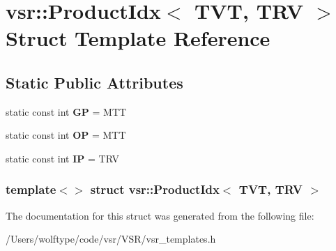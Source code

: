 \hypertarget{structvsr_1_1_product_idx_3_01_t_v_t_00_01_t_r_v_01_4}{\section{vsr\-:\-:Product\-Idx$<$ T\-V\-T, T\-R\-V $>$ Struct Template Reference}
\label{structvsr_1_1_product_idx_3_01_t_v_t_00_01_t_r_v_01_4}
}
\subsection*{Static Public Attributes}
\begin{DoxyCompactItemize}
\item 
\hypertarget{structvsr_1_1_product_idx_3_01_t_v_t_00_01_t_r_v_01_4_a828f12d7cfa2a603894dca8820d804c8}{static const int {\bfseries G\-P} = M\-T\-T}\label{structvsr_1_1_product_idx_3_01_t_v_t_00_01_t_r_v_01_4_a828f12d7cfa2a603894dca8820d804c8}

\item 
\hypertarget{structvsr_1_1_product_idx_3_01_t_v_t_00_01_t_r_v_01_4_ae8e260a0cc7a30100ac0fe132a823baa}{static const int {\bfseries O\-P} = M\-T\-T}\label{structvsr_1_1_product_idx_3_01_t_v_t_00_01_t_r_v_01_4_ae8e260a0cc7a30100ac0fe132a823baa}

\item 
\hypertarget{structvsr_1_1_product_idx_3_01_t_v_t_00_01_t_r_v_01_4_a2198e257dcaee978f438597cedb15071}{static const int {\bfseries I\-P} = T\-R\-V}\label{structvsr_1_1_product_idx_3_01_t_v_t_00_01_t_r_v_01_4_a2198e257dcaee978f438597cedb15071}

\end{DoxyCompactItemize}
\subsubsection*{template$<$$>$ struct vsr\-::\-Product\-Idx$<$ T\-V\-T, T\-R\-V $>$}



The documentation for this struct was generated from the following file\-:\begin{DoxyCompactItemize}
\item 
/\-Users/wolftype/code/vsr/\-V\-S\-R/vsr\-\_\-templates.\-h\end{DoxyCompactItemize}
